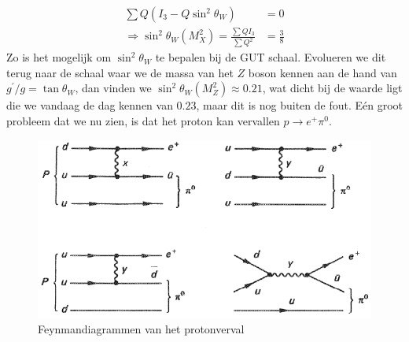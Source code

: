 \documentclass[../main.tex]{subfiles}
\begin{document}
\begin{equation}
    \begin{aligned}
        \label{eq:z_to_gamma_gut}
        \sum Q\left(I_{3}-Q \sin ^{2} \theta_{W}\right) &=0 \\
        \Rightarrow \sin ^{2} \theta_{W}\left(M_{X}^{2}\right)=\frac{\sum Q I_{3}}{\sum Q^{2}} &=\frac{3}{8}
    \end{aligned}
\end{equation}
Zo is het mogelijk om $\sin^2\theta_W$ te bepalen bij de GUT schaal. Evolueren we dit terug naar de schaal waar we de massa van het $Z$ boson kennen aan de hand van $g^{\prime} / g=\tan \theta_{W}$, dan vinden we $\sin ^{2} \theta_{W}\left(M_{Z}^{2}\right) \approx 0.21$, wat dicht bij de waarde ligt die we vandaag de dag kennen van $0.23$, maar dit is nog buiten de fout. Eén groot probleem dat we nu zien, is dat het proton kan vervallen $p \rightarrow e^{+} \pi^{0}$.

\begin{figure}[h]
    \centering
    \includegraphics[width=0.6\linewidth]{physics_beyond_the_standard_model/proton_verval.png}
    \caption{Feynmandiagrammen van het protonverval}%
    \label{fig:physics_beyond_the_standard_model/proton_verval}
\end{figure}
\end{document}
